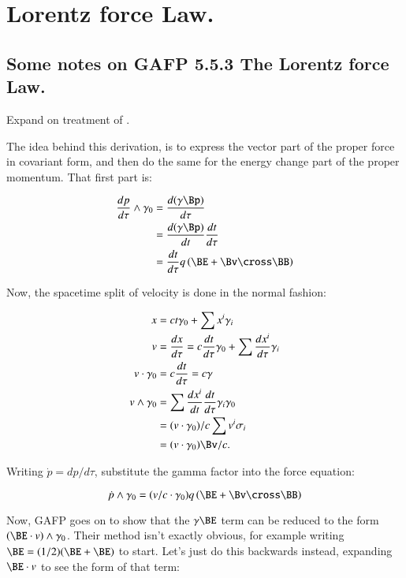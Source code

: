 \chapter{Lorentz force Law.}\label{chap:PJSrGAFPLorentzForce}

\section{Some notes on GAFP 5.5.3 The Lorentz force Law.}

Expand on treatment of \cite{doran2003gap}.

The idea behind this derivation, is to express the vector part of the proper force in covariant form, and then
do the same for the energy change part of the proper momentum.  That first part is:

\begin{align*}
\frac{dp}{d\tau} \wedge \gamma_0
&= \frac{d (\gamma \Bp)}{d\tau} \\
&= \frac{d (\gamma \Bp)}{dt} \frac{dt}{d\tau} \\
&= \frac{dt}{d\tau} q \left( \BE + \Bv \cross \BB \right)
\end{align*}

Now, the spacetime split of velocity is done in the normal fashion:

\begin{align*}
x &= c t \gamma_0 + \sum x^i \gamma_i \\
v &= \frac{dx}{d\tau} = c \frac{dt}{d\tau} \gamma_0 + \sum \frac{dx^i}{d\tau} \gamma_i \\
v \cdot \gamma_0 &= c \frac{dt}{d\tau} = c \gamma \\
v \wedge \gamma_0
&= \sum \frac{dx^i}{dt} \frac{dt}{d\tau} \gamma_i \gamma_0 \\
&= (v \cdot \gamma_0)/c \sum v^i \sigma_i \\
&= (v \cdot \gamma_0) \Bv/c.
\end{align*}

Writing $\dot{p} = dp/d\tau$, substitute the gamma factor into the force equation:

\begin{equation*}
\dot{p} \wedge \gamma_0 = ( v/c \cdot \gamma_0 ) q \left( \BE + \Bv \cross \BB \right)
\end{equation*}

Now, GAFP goes on to show that the $\gamma \BE$ term can be reduced to the form $(\BE \cdot v) \wedge \gamma_0$.  Their
method isn't exactly obvious, for example writing $\BE = (1/2)(\BE + \BE)$ to start.  Let's just do this backwards
instead, expanding $\BE \cdot v$ to see the form of that term:

